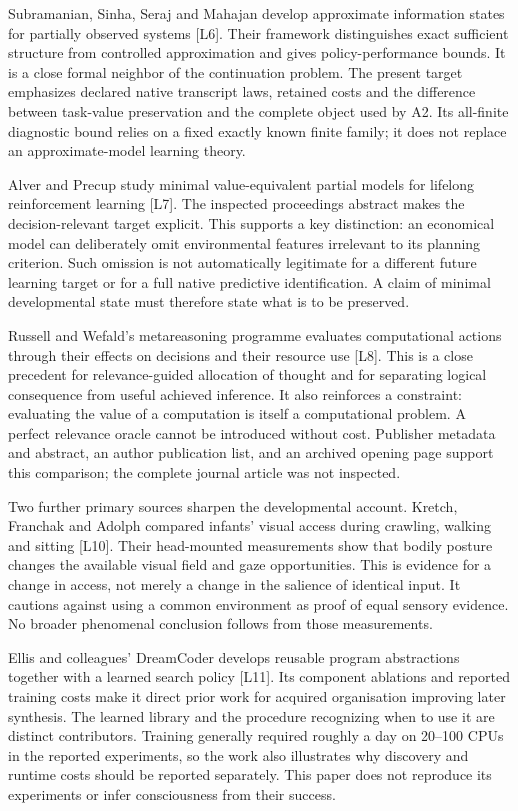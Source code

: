 \documentclass[
  11pt,
  a4paper,
]{article}
\begin{document}
Subramanian, Sinha, Seraj and Mahajan develop approximate information
states for partially observed systems {[}L6{]}. Their framework
distinguishes exact sufficient structure from controlled approximation
and gives policy-performance bounds. It is a close formal neighbor of
the continuation problem. The present target emphasizes declared native
transcript laws, retained costs and the difference between task-value
preservation and the complete object used by A2. Its all-finite
diagnostic bound relies on a fixed exactly known finite family; it does
not replace an approximate-model learning theory.

Alver and Precup study minimal value-equivalent partial models for
lifelong reinforcement learning {[}L7{]}. The inspected proceedings
abstract makes the decision-relevant target explicit. This supports a
key distinction: an economical model can deliberately omit environmental
features irrelevant to its planning criterion. Such omission is not
automatically legitimate for a different future learning target or for a
full native predictive identification. A claim of minimal developmental
state must therefore state what is to be preserved.

Russell and Wefald's metareasoning programme evaluates computational
actions through their effects on decisions and their resource use
{[}L8{]}. This is a close precedent for relevance-guided allocation of
thought and for separating logical consequence from useful achieved
inference. It also reinforces a constraint: evaluating the value of a
computation is itself a computational problem. A perfect relevance
oracle cannot be introduced without cost. Publisher metadata and
abstract, an author publication list, and an archived opening page
support this comparison; the complete journal article was not inspected.

Two further primary sources sharpen the developmental account. Kretch,
Franchak and Adolph compared infants' visual access during crawling,
walking and sitting {[}L10{]}. Their head-mounted measurements show that
bodily posture changes the available visual field and gaze
opportunities. This is evidence for a change in access, not merely a
change in the salience of identical input. It cautions against using a
common environment as proof of equal sensory evidence. No broader
phenomenal conclusion follows from those measurements.

Ellis and colleagues' DreamCoder develops reusable program abstractions
together with a learned search policy {[}L11{]}. Its component ablations
and reported training costs make it direct prior work for acquired
organisation improving later synthesis. The learned library and the
procedure recognizing when to use it are distinct contributors. Training
generally required roughly a day on 20--100 CPUs in the reported
experiments, so the work also illustrates why discovery and runtime
costs should be reported separately. This paper does not reproduce its
experiments or infer consciousness from their success.
\end{document}
